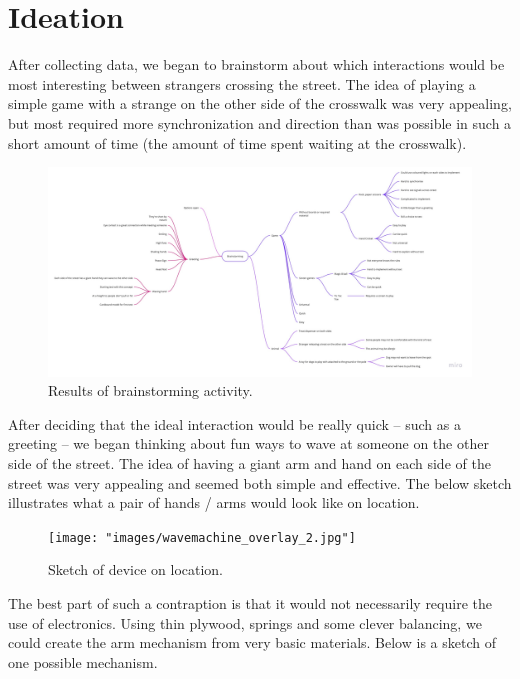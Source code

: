 \documentclass[11pt]{report}
\begin{document}
\section*{Ideation}

After collecting data, we began to brainstorm about which interactions would be most interesting between strangers crossing the street. The idea of playing a simple game with a strange on the other side of the crosswalk was very appealing, but most required more synchronization and direction than was possible in such a short amount of time (the amount of time spent waiting at the crosswalk).
 
\begin{figure}[ht]
\centering
\includegraphics[width=1.4\textwidth, angle=90]{"images/ms1_brainstorming.png"}
\caption{Results of brainstorming activity.}
\label{fig:brainstorm}
\end{figure}

After deciding that the ideal interaction would be really quick -- such as a greeting -- we began thinking about fun ways to wave at someone on the other side of the street. The idea of having a giant arm and hand on each side of the street was very appealing and seemed both simple and effective. The below sketch illustrates what a pair of hands / arms would look like on location.
 
\begin{figure}[ht]
\centering
\texttt{[image: "images/wavemachine\_overlay\_2.jpg"]}
\caption{Sketch of device on location.}
\label{fig:overlay}
\end{figure}

The best part of such a contraption is that it would not necessarily require the use of electronics. Using thin plywood, springs and some clever balancing, we could create the arm mechanism from very basic materials. Below is a sketch of one possible mechanism.
 
\end{document}
